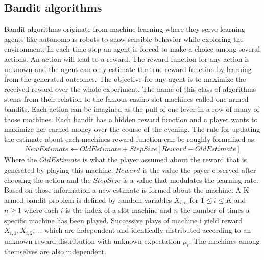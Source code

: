 \documentclass[main.tex]{subfiles}
\begin{document}
\subsection{Bandit algorithms}
Bandit algorithms originate from machine learning where they serve learning agents like autonomous robots to show sensible behavior while exploring the environment. In each time step an agent is forced to make a choice among several actions. An action will lead to a reward. The reward function for any action is unknown and the agent can only estimate the true reward function by learning from the generated outcomes. The objective for any agent is to maximize the received reward over the whole experiment. The name of this class of algorithms stems from their relation to the famous casino slot machines called one-armed bandits. Each action can be imagined as the pull of one lever in a row of many of those machines. Each bandit has a hidden reward function and a player wants to maximize her earned money over the course of the evening. The rule for updating the estimate about each machines reward function can be roughly formalized as:
\begin{align*}
NewEstimate \leftarrow OldEstimate + StepSize[Reward - OldEstimate]
\end{align*}
Where the $OldEstimate$ is what the player assumed about the reward that is generated by playing this machine. $Reward$ is the value the payer observed after choosing the action and the $StepSize$ is a value that modulates the learning rate. Based on those information a new estimate is formed about the machine. A K-armed bandit problem is defined by random variables $X_{i,n}$ for $1 \leq i \leq K$ and $n\geq1$ where each $i$ is the index of a slot machine and $n$ the number of times a specific machine has been played. Successive plays of machine i yield reward $X_{i,1},X_{i,2},...$ which are independent and identically distributed according to an unknown reward distribution with unknown expectation $\mu_i$. The machines among themselves are also independent.
\end{document}
